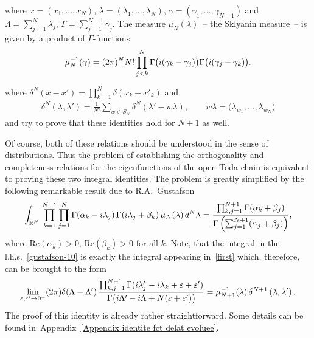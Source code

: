\documentclass[11pt]{article}
\numberwithin{equation}{section}
\numberwithin{equation}{section}
\begin{document}
\setcounter{section}{2}
where $x=(x_1,\dots,x_N)$, $\lambda = (\lambda_1,\dots,\lambda_N )$, $\gamma = (\gamma_1,\dots,\gamma_{N-1})$ and
$\Lambda = \sum^N_{j=1}\lambda_j$, $\Gamma = \sum^{N-1}_{j=1}\gamma_j$. The measure $\mu_N(\lambda)$~-- the Sklyanin measure~-- is given
by a product of $\Gamma$-functions
\begin{gather*}
\mu_N^{-1}(\gamma) =(2\pi)^N {N!}\prod^N_{j < k}\Gamma\big({\rm i}(\gamma_k-\gamma_j)\big)
\Gamma\big({\rm i}(\gamma_j-\gamma_k)\big).
\end{gather*}

\setcounter{equation}{2}
where $\delta^N(x-x')=\prod_{k=1}^N\delta(x_k-x'_k)$ and{\samepage
\begin{gather}\label{deltaN}
\delta^N(\lambda, \lambda')=\frac1{N!}\sum_{w\in S_N} \delta^N(\lambda'-w\lambda), \qquad w\lambda=\big(\lambda_{w_1},\dots, \lambda_{w_N}\big)
\end{gather}
and try to prove that these identities hold for $N+1$ as well.}

\setcounter{equation}{5}
Of course, both of these relations should be understood in the sense of distributions. Thus the problem of establishing the orthogonality
and completeness relations for the eigenfunctions of the open Toda chain is equivalent to proving these two integral identities. The
problem is greatly simplified by the following remarkable result due to R.A.~Gustafson~\cite[Theorem~5.1]{MR1139492}
%
\begin{align}\label{gustafson-10}
%
\int_{\mathbb R^N}\,
\prod_{k=1}^{N+1}\prod_{j=1}^N \Gamma( \alpha_k-{\rm i}\lambda_j)\,\Gamma({\rm i}\lambda_j+\beta_k)\,
\mu_N(\lambda)\, {\rm d}^N\lambda
=\frac{\prod_{k,j=1}^{N+1}\Gamma(\alpha_k+\beta_j)}
{\Gamma\left(\sum_{j=1}^{N+1}(\alpha_j+\beta_j)\right)},
%
\end{align}
%
where $\text{Re}(\alpha_k)>0$, $\text{Re}(\beta_k)>0$ for all $k$. Note, that the integral in the l.h.s.~\eqref{gustafson-10} is exactly
the integral appearing in~\eqref{first} which, therefore, can be brought to the form
%
\begin{align}\label{first-reduced}
\lim_{\varepsilon,\varepsilon' \rightarrow 0^+} (2\pi) \delta(\Lambda-\Lambda')\,
\frac{\prod_{k,j=1}^{N+1}\Gamma({\rm i}\lambda'_j-{\rm i}\lambda_k+\varepsilon+\varepsilon')}
{\Gamma\big({\rm i}\Lambda'-{\rm i}\Lambda+N(\varepsilon+\varepsilon')\big)} = {\mu_{N+1}^{-1}(\lambda)}\,
\delta^{N+1}\left(\lambda,\lambda'\right).
\end{align}
The proof of this identity is already rather straightforward. Some details can be found in~Appen\-dix~\ref{Appendix identite fct delat
evoluee}.
\end{document}
